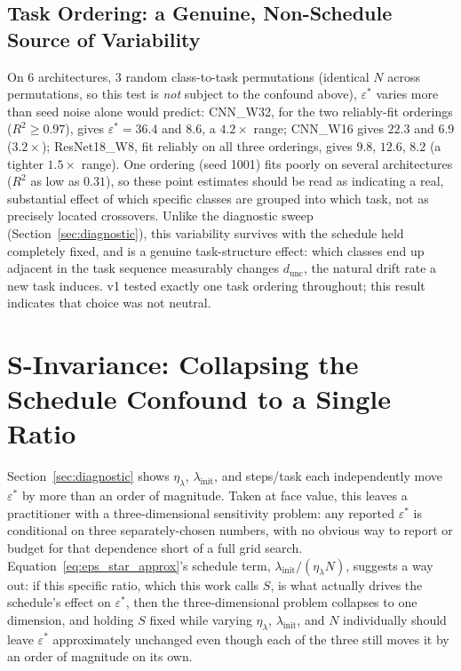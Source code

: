 \documentclass[11pt]{article}
\newcommand{\eps}{\varepsilon}
\newcommand{\epsstar}{\eps^{*}}
\begin{document}
\subsection{Task Ordering: a Genuine, Non-Schedule Source of Variability}
On 6 architectures, 3 random class-to-task permutations (identical $N$
across permutations, so this test is \emph{not} subject to the confound
above), $\epsstar$ varies more than seed noise alone would predict:
CNN\_W32, for the two reliably-fit orderings ($R^2\ge0.97$), gives
$\epsstar=36.4$ and $8.6$, a $4.2\times$ range; CNN\_W16 gives $22.3$ and
$6.9$ ($3.2\times$); ResNet18\_W8, fit reliably on all three orderings,
gives $9.8$, $12.6$, $8.2$ (a tighter $1.5\times$ range). One ordering
(seed 1001) fits poorly on several architectures ($R^2$ as low as $0.31$),
so these point estimates should be read as indicating a real, substantial
effect of which specific classes are grouped into which task, not as
precisely located crossovers. Unlike the diagnostic sweep
(Section~\ref{sec:diagnostic}), this variability survives with the schedule
held completely fixed, and is a genuine task-structure effect: which
classes end up adjacent in the task sequence measurably changes
$d_{\mathrm{unc}}$, the natural drift rate a new task induces. v1 tested
exactly one task ordering throughout; this result indicates that choice was
not neutral.

\section{S-Invariance: Collapsing the Schedule Confound to a Single Ratio}
\label{sec:sinvariance}

Section~\ref{sec:diagnostic} shows $\eta_\lambda$, $\lambda_{\mathrm{init}}$,
and steps/task each independently move $\epsstar$ by more than an order of
magnitude. Taken at face value, this leaves a practitioner with a
three-dimensional sensitivity problem: any reported $\epsstar$ is
conditional on three separately-chosen numbers, with no obvious way to
report or budget for that dependence short of a full grid search.
Equation~\ref{eq:eps_star_approx}'s schedule term, $\lambda_{\mathrm{init}}/(\eta_\lambda N)$,
suggests a way out: if this specific ratio, which this work calls $S$, is what
actually drives the schedule's effect on $\epsstar$, then the
three-dimensional problem collapses to one dimension, and holding $S$ fixed
while varying $\eta_\lambda$, $\lambda_{\mathrm{init}}$, and $N$
individually should leave $\epsstar$ approximately unchanged even though
each of the three still moves it by an order of magnitude on its own.
\end{document}

